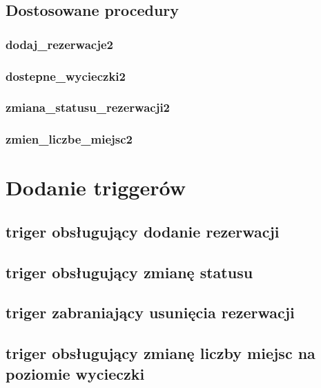 \documentclass[12pt]{article}
\begin{document}
\subsection{Dostosowane procedury}

\subsubsection{dodaj\_rezerwacje2}


\subsubsection{dostepne\_wycieczki2}



\subsubsection{zmiana\_statusu\_rezerwacji2}



\subsubsection{zmien\_liczbe\_miejsc2}


\section{Dodanie triggerów}


\subsection{triger obsługujący dodanie rezerwacji}



\subsection{triger obsługujący zmianę statusu}


\subsection{triger zabraniający usunięcia rezerwacji}


\subsection{triger obsługujący zmianę liczby miejsc na poziomie wycieczki}

\end{document}
